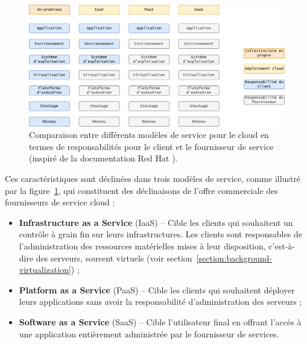 \begin{figure}[!ht]
    \centering
	\includegraphics[width=\textwidth]{2_Chapitre2/figures/service-models.png}
	\caption[Comparaison entre différents modèles de service pour le cloud en termes de responsabilités pour le client et le fournisseur de service.]{Comparaison entre différents modèles de service pour le cloud en termes de responsabilités pour le client et le fournisseur de service (inspiré de la documentation Red Hat \protect \footnotemark).}
	\label{figure:context-service-model}
\end{figure}


Ces caractéristiques sont déclinées dans trois modèles de service, comme illustré par la figure~\ref{figure:context-service-model}, qui constituent des déclinaisons de l'offre commerciale des fournisseurs de service cloud :

\begin{itemize}
    \item \textbf{Infrastructure as a Service} (\gls{IaaS}) -- Cible les clients qui souhaitent un contrôle à grain fin sur leurs infrastructures. Les clients sont responsables de l'administration des ressources matérielles mises à leur disposition, c'est-à-dire des serveurs, souvent virtuels (voir section~\ref{section:background-virtualization}) ;
    \item \textbf{Platform as a Service} (\gls{PaaS}) -- Cible les clients qui souhaitent déployer leurs applications sans avoir la responsabilité d'administration des serveurs ;
    \item \textbf{Software as a Service} (\gls{SaaS}) -- Cible l'utilisateur final en offrant l'accès à une application entièrement administrée par le fournisseur de services.
\end{itemize}

